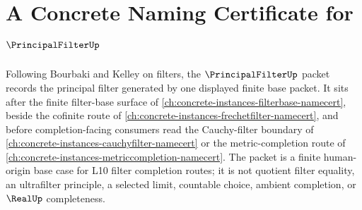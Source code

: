 \chapter{A Concrete Naming Certificate for $\PrincipalFilterUp$}
\label{ch:concrete-instances-principal-filter-namecert}

Following Bourbaki and Kelley on filters, the $\PrincipalFilterUp$ packet records the principal filter generated by one displayed finite base packet. It sits after the finite filter-base surface of \autoref{ch:concrete-instances-filterbase-namecert}, beside the cofinite route of \autoref{ch:concrete-instances-frechetfilter-namecert}, and before completion-facing consumers read the Cauchy-filter boundary of \autoref{ch:concrete-instances-cauchyfilter-namecert} or the metric-completion route of \autoref{ch:concrete-instances-metriccompletion-namecert}. The packet is a finite human-origin base case for L10 filter completion routes; it is not quotient filter equality, an ultrafilter principle, a selected limit, countable choice, ambient completion, or $\RealUp$ completeness.

